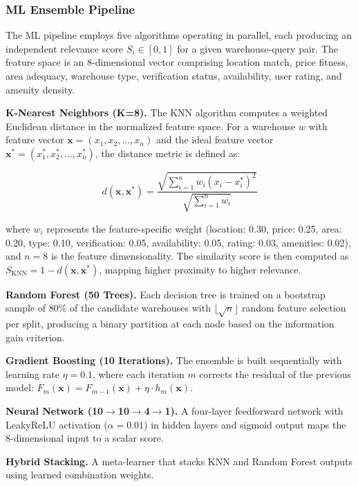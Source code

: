 \subsubsection{ML Ensemble Pipeline}

The ML pipeline employs five algorithms operating in parallel, each producing an independent relevance score $S_i \in [0, 1]$ for a given warehouse-query pair. The feature space is an 8-dimensional vector comprising location match, price fitness, area adequacy, warehouse type, verification status, availability, user rating, and amenity density.

\textbf{K-Nearest Neighbors (K=8).} The KNN algorithm computes a weighted Euclidean distance in the normalized feature space. For a warehouse $w$ with feature vector $\mathbf{x} = (x_1, x_2, \ldots, x_n)$ and the ideal feature vector $\mathbf{x}^* = (x_1^*, x_2^*, \ldots, x_n^*)$, the distance metric is defined as:

\begin{equation}
d(\mathbf{x}, \mathbf{x}^*) = \frac{\sqrt{\displaystyle\sum_{i=1}^{n} w_i \left(x_i - x_i^*\right)^2}}{\sqrt{\displaystyle\sum_{i=1}^{n} w_i}}
\label{eq:knn_distance}
\end{equation}

\noindent where $w_i$ represents the feature-specific weight (location: 0.30, price: 0.25, area: 0.20, type: 0.10, verification: 0.05, availability: 0.05, rating: 0.03, amenities: 0.02), and $n = 8$ is the feature dimensionality. The similarity score is then computed as $S_{\text{KNN}} = 1 - d(\mathbf{x}, \mathbf{x}^*)$, mapping higher proximity to higher relevance.

\textbf{Random Forest (50 Trees).} Each decision tree is trained on a bootstrap sample of 80\% of the candidate warehouses with $\lfloor\sqrt{n}\rfloor$ random feature selection per split, producing a binary partition at each node based on the information gain criterion.

\textbf{Gradient Boosting (10 Iterations).} The ensemble is built sequentially with learning rate $\eta = 0.1$, where each iteration $m$ corrects the residual of the previous model:
$F_m(\mathbf{x}) = F_{m-1}(\mathbf{x}) + \eta \cdot h_m(\mathbf{x})$.

\textbf{Neural Network (10$\rightarrow$10$\rightarrow$4$\rightarrow$1).} A four-layer feedforward network with LeakyReLU activation ($\alpha = 0.01$) in hidden layers and sigmoid output maps the 8-dimensional input to a scalar score.

\textbf{Hybrid Stacking.} A meta-learner that stacks KNN and Random Forest outputs using learned combination weights.

